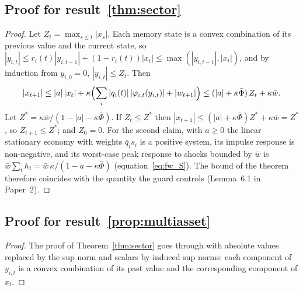 \documentclass[11pt]{article}
\theoremstyle{definition}
\theoremstyle{remark}
\begin{document}
\subsection{Proof for result~\ref{thm:sector}}\label{app:paper3proof2}
\begin{proof}
Let $Z_t=\max_{s\le t}|x_s|$. Each memory state is a convex combination of its previous value and the current state, so $|y_{i,t}|\le r_i(t)|y_{i,t-1}|+(1-r_i(t))|x_t|\le\max(|y_{i,t-1}|,|x_t|)$, and by induction from $y_{i,0}=0$, $|y_{i,t}|\le Z_t$. Then
\[
|x_{t+1}|\le|a|\,|x_t|+\kappa\Bigl(\sum_i|q_i(t)|\,|\varphi_{i,t}(y_{i,t})|+|w_{t+1}|\Bigr)\le(|a|+\kappa\bar\Phi)\,Z_t+\kappa\bar w .
\]
Let $Z^*=\kappa\bar w/(1-|a|-\kappa\bar\Phi)$. If $Z_t\le Z^*$ then $|x_{t+1}|\le(|a|+\kappa\bar\Phi)Z^*+\kappa\bar w=Z^*$, so $Z_{t+1}\le Z^*$; and $Z_0=0$. For the second claim, with $a\ge0$ the linear stationary economy with weights $\bar q_is_i$ is a positive system, its impulse response is non-negative, and its worst-case peak response to shocks bounded by $\bar w$ is $\bar w\sum_th_t=\bar w\,\kappa/(1-a-\kappa\bar\Phi)$ (equation~\eqref{eq:fw_S}). The bound of the theorem therefore coincides with the quantity the guard controls (Lemma~\textup{6.1 in Paper~2}).
\end{proof}
\subsection{Proof for result~\ref{prop:multiasset}}\label{app:paper3proof3}
\begin{proof}
The proof of Theorem~\ref{thm:sector} goes through with absolute values replaced by the sup norm and scalars by induced sup norms: each component of $y_{i,t}$ is a convex combination of its past value and the corresponding component of $x_t$.
\end{proof}
\end{document}
